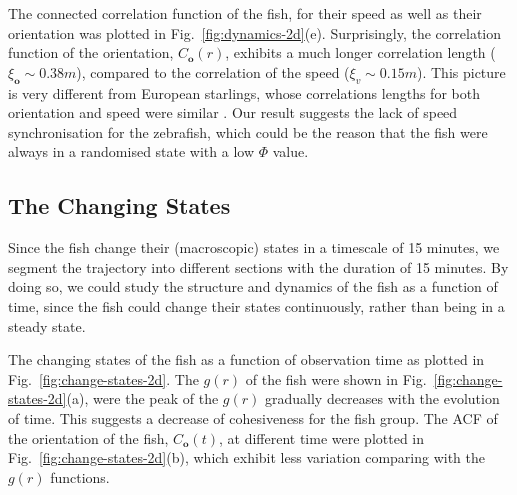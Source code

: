 \documentclass[11pt,twoside]{report}
\begin{document}
The connected correlation function of the fish, for their speed as well as their orientation was plotted in Fig.~\ref{fig:dynamics-2d}(e). Surprisingly, the correlation function of the orientation, $C_\mathbf{o}(r)$, exhibits a much longer correlation length ($\xi_\mathbf{o} \sim 0.38m$), compared to the correlation of the speed ($\xi_v \sim 0.15m$). This picture is very different from European starlings, whose correlations lengths for both orientation and speed were similar \cite{cavagna2010}. Our result suggests the lack of speed synchronisation for the zebrafish, which could be the reason that the fish were always in a randomised state with a low $\Phi$ value.




\subsection{The Changing States}
\label{section:change-states-2d}

Since the fish change their (macroscopic) states in a timescale of 15 minutes, we segment the trajectory into different sections with the duration of 15 minutes. By doing so, we could study the structure and dynamics of the fish as a function of time, since the fish could change their states continuously, rather than being in a steady state.

The changing states of the fish as a function of observation time as plotted in Fig.~\ref{fig:change-states-2d}. The $g(r)$ of the fish were shown in Fig.~\ref{fig:change-states-2d}(a), were the peak of the $g(r)$ gradually decreases with the evolution of time. This suggests a decrease of cohesiveness for the fish group. The ACF of the orientation of the fish, $C_\mathbf{o}(t)$, at different time were plotted in Fig.~\ref{fig:change-states-2d}(b), which exhibit less variation comparing with the $g(r)$ functions.
\end{document}

